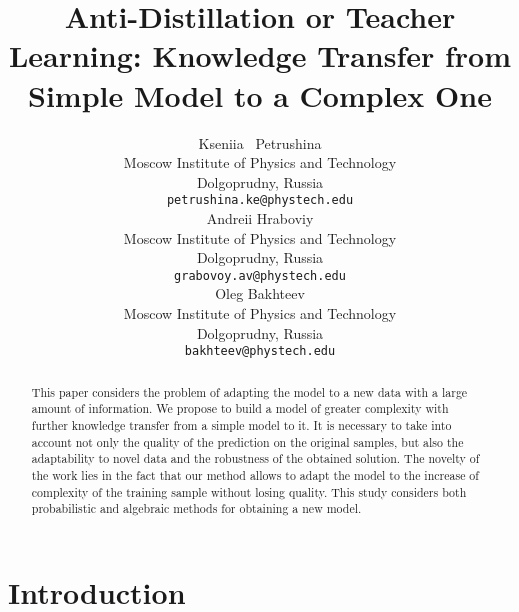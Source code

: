 \documentclass{article}
\title{Anti-Distillation or Teacher Learning: Knowledge Transfer from Simple Model to a Complex One}
\author{ Kseniia ~Petrushina \\
	Moscow Institute of Physics and Technology\\
	Dolgoprudny, Russia \\
	\texttt{petrushina.ke@phystech.edu} \\
	\And
	Andreii Hraboviy \\
	Moscow Institute of Physics and Technology\\
	Dolgoprudny, Russia \\
	\texttt{grabovoy.av@phystech.edu} \\
	\And
	Oleg Bakhteev \\
	Moscow Institute of Physics and Technology\\
	Dolgoprudny, Russia \\
	\texttt{bakhteev@phystech.edu}
}
\date{}
\begin{document}
\maketitle

\begin{abstract}
	This paper considers the problem of adapting the model to a new data with a large amount of information. We propose to build a model of greater complexity with further knowledge transfer from a simple model to it. It is necessary to take into account not only the quality of the prediction on the original samples, but also the adaptability to novel data and the robustness of the obtained solution. The novelty of the work lies in the fact that our method allows to adapt the model to the increase of complexity of the training sample without losing quality. This study considers both probabilistic and algebraic methods for obtaining a new model.
\end{abstract}



\section{Introduction}




\end{document}
